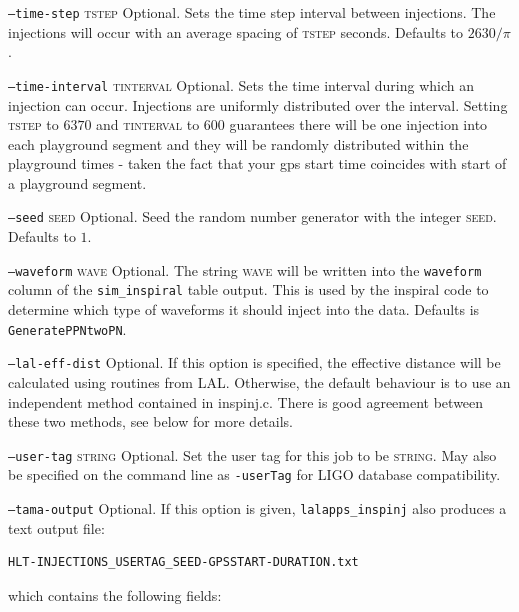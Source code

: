 \begin{entry}
\begin{entry}
\item[\texttt{--time-step} \textsc{tstep}]
Optional. Sets the time step interval between injections. The injections will
occur with an average spacing of \textsc{tstep} seconds. Defaults to 
$2630/\pi$.

\item[\texttt{--time-interval} \textsc{tinterval}]
Optional. Sets the time interval during which an injection can occur. 
Injections are uniformly distributed over the interval.  Setting \textsc{tstep}
to $6370$ and \textsc{tinterval} to 600 guarantees there will be one injection
into each playground segment and they will be randomly distributed within the
playground times - taken the fact that your gps start time coincides with start of a playground segment.

\item[\texttt{--seed} \textsc{seed}]
Optional. Seed the random number generator with the integer \textsc{seed}.
Defaults to $1$.

\item[\texttt{--waveform} \textsc{wave}]
Optional. The string \textsc{wave} will be written into the \texttt{waveform}
column of the \texttt{sim\_inspiral} table output. This is used by the
inspiral code to determine which type of waveforms it should inject into the
data. Defaults is \texttt{GeneratePPNtwoPN}.

\item[\texttt{--lal-eff-dist}]
Optional.  If this option is specified, the effective distance will be
calculated using routines from LAL.  Otherwise, the default behaviour is to
use an independent method contained in inspinj.c.  There is good agreement
between these two methods, see below for more details.

\item[\texttt{--user-tag} \textsc{string}] Optional. Set the user tag for this
job to be \textsc{string}. May also be specified on the command line as 
\texttt{-userTag} for LIGO database compatibility.

\item[\texttt{--tama-output}]
Optional.  If this option is given, \verb+lalapps_inspinj+ also produces a 
text output file:
\begin{center}
\begin{verbatim}
HLT-INJECTIONS_USERTAG_SEED-GPSSTART-DURATION.txt
\end{verbatim}
\end{center}
which contains the following fields:


\end{entry}
\end{entry}
